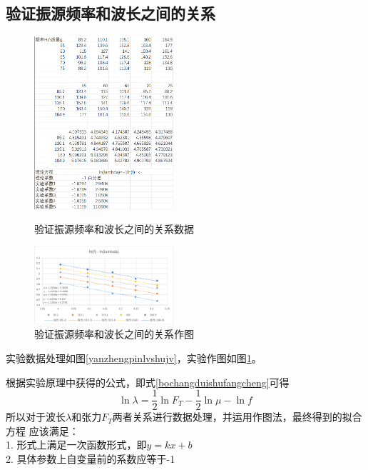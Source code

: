 \documentclass{ctexart}
\begin{document}
  \subsection{验证振源频率和波长之间的关系}
  \begin{figure}[b]
    \centering
    \begin{minipage}[b]{0.48\textwidth}
      \centering
      \includegraphics[width=0.46\textwidth]{yanzhengpinlvshujv.png}
      \caption{验证振源频率和波长之间的关系数据}\label{yanzhengpinlvshujv}
    \end{minipage}
    \begin{minipage}[b]{0.48\textwidth}
      \centering
      \includegraphics[width=0.46\textwidth]{yanzhengpinlvzuotu.png}
      \caption{验证振源频率和波长之间的关系作图}\label{yanzhengpinlvzuotu}
    \end{minipage}
  \end{figure}

  实验数据处理如图\ref{yanzhengpinlvshujv}，实验作图如图\ref{yanzhengpinlvzuotu}。

  根据实验原理中获得的公式，即式\ref{bochangduishufangcheng}可得
  $$\ln \lambda = \frac{1}{2} \ln F_{T}-\frac{1}{2} \ln \mu - \ln f$$
  所以对于波长$\lambda$和张力$F_{T}$两者关系进行数据处理，并运用作图法，最终得到的拟合方程
  应该满足：\\
  1. 形式上满足一次函数形式，即$y=kx+b$\\
  2. 具体参数上自变量前的系数应等于-1
\end{document}
